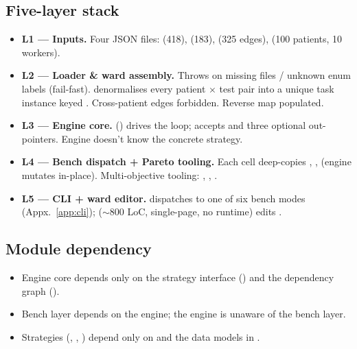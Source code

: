 \subsection{Five-layer stack}

\begin{itemize}
  \item \textbf{L1 --- Inputs.}
        Four JSON files:  (418),
         (183),  (325
        edges),  (100 patients, 10 workers).
  \item \textbf{L2 --- Loader \& ward assembly.}
        Throws on missing files / unknown enum labels (fail-fast).
         denormalises every patient $\times$ test
        pair into a unique task instance keyed
        . Cross-patient edges
        forbidden. Reverse map  populated.
  \item \textbf{L3 --- Engine core.}
         () drives the loop;
        accepts  and three optional out-pointers.
        Engine doesn't know the concrete strategy.
  \item \textbf{L4 --- Bench dispatch + Pareto tooling.}
        Each cell deep-copies , ,
         (engine mutates in-place). Multi-objective
        tooling: ,
        , .
  \item \textbf{L5 --- CLI + ward editor.}
         dispatches to one of six bench modes
        (Appx.~\ref{app:cli});  ($\sim$800 LoC,
        single-page, no runtime) edits .
\end{itemize}

\subsection{Module dependency}

\begin{itemize}
  \item Engine core depends only on the strategy interface
        () and the dependency graph
        ().
  \item Bench layer depends on the engine; the engine is unaware of
        the bench layer.
  \item Strategies (, ,
        ) depend only on  and
        the data models in .
\end{itemize}

